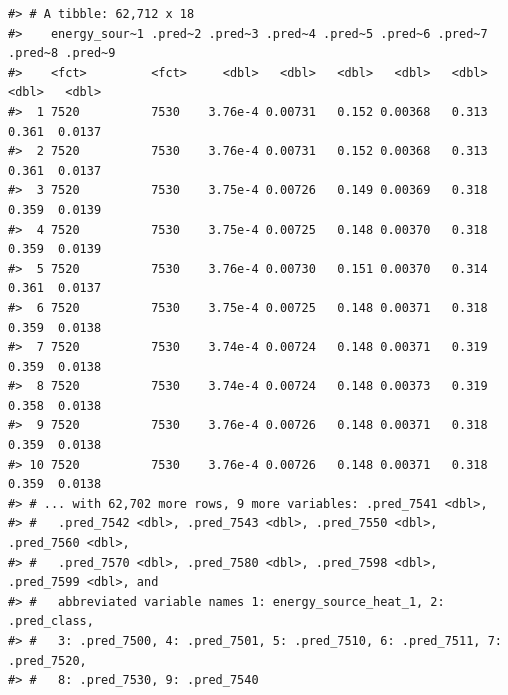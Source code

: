 \documentclass[
  letterpaper,
  DIV=11,
  numbers=noendperiod]{scrreprt}
\begin{document}
\begin{verbatim}
#> # A tibble: 62,712 x 18
#>    energy_sour~1 .pred~2 .pred~3 .pred~4 .pred~5 .pred~6 .pred~7 .pred~8 .pred~9
#>    <fct>         <fct>     <dbl>   <dbl>   <dbl>   <dbl>   <dbl>   <dbl>   <dbl>
#>  1 7520          7530    3.76e-4 0.00731   0.152 0.00368   0.313   0.361  0.0137
#>  2 7520          7530    3.76e-4 0.00731   0.152 0.00368   0.313   0.361  0.0137
#>  3 7520          7530    3.75e-4 0.00726   0.149 0.00369   0.318   0.359  0.0139
#>  4 7520          7530    3.75e-4 0.00725   0.148 0.00370   0.318   0.359  0.0139
#>  5 7520          7530    3.76e-4 0.00730   0.151 0.00370   0.314   0.361  0.0137
#>  6 7520          7530    3.75e-4 0.00725   0.148 0.00371   0.318   0.359  0.0138
#>  7 7520          7530    3.74e-4 0.00724   0.148 0.00371   0.319   0.359  0.0138
#>  8 7520          7530    3.74e-4 0.00724   0.148 0.00373   0.319   0.358  0.0138
#>  9 7520          7530    3.76e-4 0.00726   0.148 0.00371   0.318   0.359  0.0138
#> 10 7520          7530    3.76e-4 0.00726   0.148 0.00371   0.318   0.359  0.0138
#> # ... with 62,702 more rows, 9 more variables: .pred_7541 <dbl>,
#> #   .pred_7542 <dbl>, .pred_7543 <dbl>, .pred_7550 <dbl>, .pred_7560 <dbl>,
#> #   .pred_7570 <dbl>, .pred_7580 <dbl>, .pred_7598 <dbl>, .pred_7599 <dbl>, and
#> #   abbreviated variable names 1: energy_source_heat_1, 2: .pred_class,
#> #   3: .pred_7500, 4: .pred_7501, 5: .pred_7510, 6: .pred_7511, 7: .pred_7520,
#> #   8: .pred_7530, 9: .pred_7540
\end{verbatim}
\end{document}
